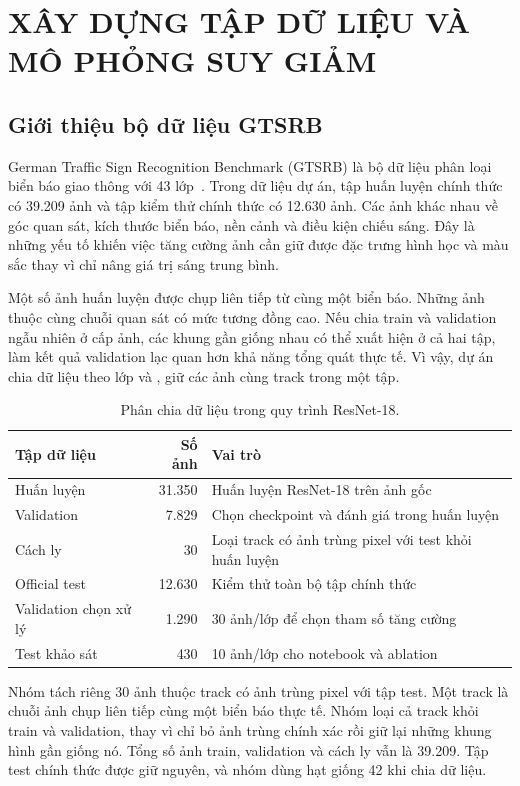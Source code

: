 \section{XÂY DỰNG TẬP DỮ LIỆU VÀ MÔ PHỎNG SUY GIẢM}
\subsection{Giới thiệu bộ dữ liệu GTSRB}
German Traffic Sign Recognition Benchmark (GTSRB) là bộ dữ liệu phân loại biển báo giao thông với 43 lớp~\cite{gtsrb}. Trong dữ liệu dự án, tập huấn luyện chính thức có 39.209 ảnh và tập kiểm thử chính thức có 12.630 ảnh. Các ảnh khác nhau về góc quan sát, kích thước biển báo, nền cảnh và điều kiện chiếu sáng. Đây là những yếu tố khiến việc tăng cường ảnh cần giữ được đặc trưng hình học và màu sắc thay vì chỉ nâng giá trị sáng trung bình.

Một số ảnh huấn luyện được chụp liên tiếp từ cùng một biển báo. Những ảnh thuộc cùng chuỗi quan sát có mức tương đồng cao. Nếu chia train và validation ngẫu nhiên ở cấp ảnh, các khung gần giống nhau có thể xuất hiện ở cả hai tập, làm kết quả validation lạc quan hơn khả năng tổng quát thực tế. Vì vậy, dự án chia dữ liệu theo lớp và , giữ các ảnh cùng track trong một tập.

\par
\begin{table}[htbp]
\centering
\caption{Phân chia dữ liệu trong quy trình ResNet-18.}
\begin{tabular}{P{4.0cm}rP{7.3cm}}
\toprule
Tập dữ liệu & Số ảnh & Vai trò \\
\midrule
Huấn luyện & 31.350 & Huấn luyện ResNet-18 trên ảnh gốc \\
Validation & 7.829 & Chọn checkpoint và đánh giá trong huấn luyện \\
Cách ly & 30 & Loại track có ảnh trùng pixel với test khỏi huấn luyện \\
Official test & 12.630 & Kiểm thử toàn bộ tập chính thức \\
Validation chọn xử lý & 1.290 & 30 ảnh/lớp để chọn tham số tăng cường \\
Test khảo sát & 430 & 10 ảnh/lớp cho notebook và ablation \\
\bottomrule
\end{tabular}
\label{tab:splits}
\end{table}\par


Nhóm tách riêng 30 ảnh thuộc track có ảnh trùng pixel với tập test. Một track là chuỗi ảnh chụp liên tiếp cùng một biển báo thực tế. Nhóm loại cả track khỏi train và validation, thay vì chỉ bỏ ảnh trùng chính xác rồi giữ lại những khung hình gần giống nó. Tổng số ảnh train, validation và cách ly vẫn là 39.209. Tập test chính thức được giữ nguyên, và nhóm dùng hạt giống 42 khi chia dữ liệu.

